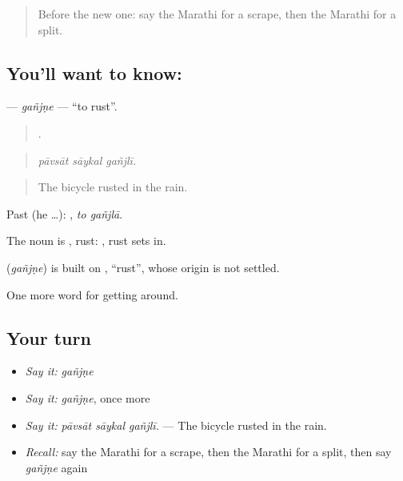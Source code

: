 \label{lesson:MR-C433-ganjne}



\begin{quote}
Before the new one: say the Marathi for a scrape, then the Marathi for a split.
\end{quote}

\subsection*{You'll want to know: }
\textbf{} — \emph{gañjṇe} — \textquotedblleft{}to rust\textquotedblright{}.

\begin{quote}
  .
\end{quote}

\begin{quote}
\emph{pāvsāt sāykal gañjlī.}
\end{quote}

\begin{quote}
The bicycle rusted in the rain.
\end{quote}

Past (he …):  , \emph{to gañjlā}.

The noun is , rust:  , rust sets in.

\begin{cousinweb}
\textbf{} (\emph{gañjṇe}) is built on \textbf{}, \textquotedblleft{}rust\textquotedblright{}, whose origin is not settled.
\end{cousinweb}

\begin{grammarlens}[title={What you've built}]
One more word for getting around.
\end{grammarlens}

\subsection*{Your turn}
\begin{itemize}
\raggedright
  \item \emph{Say it:} \emph{gañjṇe}
  \item \emph{Say it:} \emph{gañjṇe}, once more
  \item \emph{Say it:} \emph{pāvsāt sāykal gañjlī.} — The bicycle rusted in the rain.
  \item \emph{Recall:} say the Marathi for a scrape, then the Marathi for a split, then say \emph{gañjṇe} again
\end{itemize}

